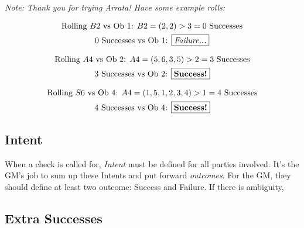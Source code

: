 \documentclass[../main.tex]{subfiles}
\begin{document}
    \emph{Note: Thank you for trying Arrata! Have some example rolls:}
    \\
    \begin{mdframed}[style=Arrata]
        \begin{equation*}
            \begin{gathered}
                \text{Rolling $B2$ vs Ob 1: }                      
                B2 = (2, 2)>3 = 0 \text{ Successes}               \\
                \text{0 Successes vs Ob 1: \boxed{\emph{Failure...}}}
            \end{gathered}
        \end{equation*}

        \begin{equation*}
            \begin{gathered}
                \text{Rolling $A4$ vs Ob 2: }                      
                A4 = (5, 6, 3, 5)>2 = 3 \text{ Successes}         \\
                \text{3 Successes vs Ob 2: \boxed{\textbf{Success!}}}
            \end{gathered}
        \end{equation*}

        \begin{equation*}
            \begin{gathered}
                \text{Rolling $S6$ vs Ob 4: }                      
                A4 = (1, 5, 1, 2, 3, 4)>1 = 4 \text{ Successes}   \\
                \text{4 Successes vs Ob 4: \boxed{\textbf{Success!}}}
            \end{gathered}
        \end{equation*}
    \end{mdframed}

    \subsection{Intent}

    When a check is called for, \emph{Intent} must be defined for all parties involved. It's the GM's job to sum up these Intents and put forward \emph{outcomes}. For the GM, they should define at least two outcome: Success and Failure. If there is ambiguity, 

    \subsection{Extra Successes}
\end{document}
